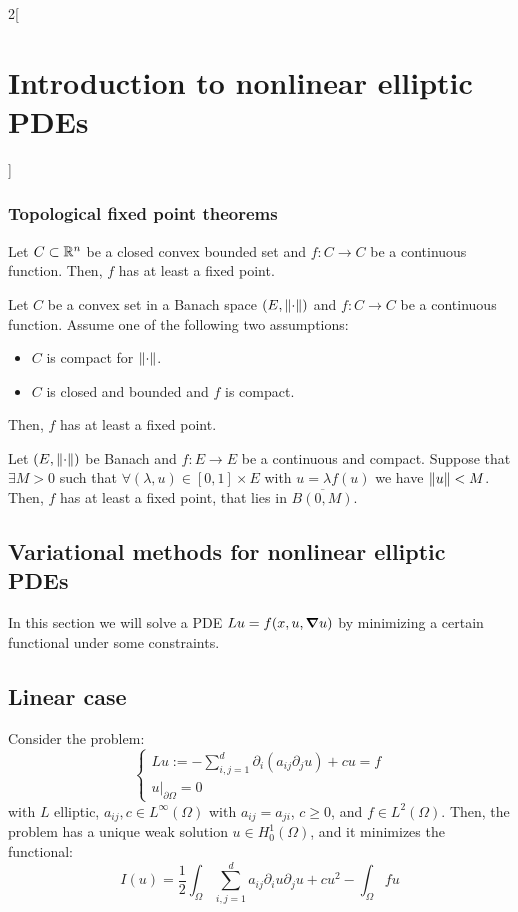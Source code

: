 \documentclass[../../../main_math.tex]{subfiles}
\begin{document}
\begin{multicols}{2}[\section{Introduction to nonlinear elliptic PDEs}]
  \subsubsection{Topological fixed point theorems}
  \begin{theorem}
    Let $C\subset \mathbb{R}^n$ be a closed convex bounded set and $f:C\to C$ be a continuous function. Then, $f$ has at least a fixed point.
  \end{theorem}
  \begin{theorem}
    Let $C$ be a convex set in a Banach space $(E,\left\|\cdot\right\|)$ and $f:C\to C$ be a continuous function. Assume one of the following two assumptions:
    \begin{itemize}
      \item $C$ is compact for $\left\|\cdot\right\|$.
      \item $C$ is closed and bounded and $f$ is compact.
    \end{itemize}
    Then, $f$ has at least a fixed point.
  \end{theorem}
  \begin{theorem}
    Let $(E, \left\|\cdot\right\|)$ be Banach and $f:E\to E$ be a continuous and compact. Suppose that $\exists M>0$ such that $\forall (\lambda,u)\in [0,1]\times E$ with $u=\lambda f(u)$ we have $\left\|u\right\|<M$. Then, $f$ has at least a fixed point, that lies in $\overline{B(0,M)}$.
  \end{theorem}
  \subsection{Variational methods for nonlinear elliptic PDEs}
  In this section we will solve a PDE $Lu=f(x,u,\grad u)$ by minimizing a certain functional under some constraints.
  \subsection{Linear case}
  \begin{proposition}
    Consider the problem:
    $$
      \begin{cases}
        Lu:=-\sum_{i,j=1}^d \partial_i(a_{ij}\partial_j u)+cu=f \\
        u|_{\partial\Omega}=0
      \end{cases}
    $$
    with $L$ elliptic, $a_{ij},c\in L^\infty(\Omega)$ with $a_{ij}= a_{ji}$, $c\geq 0$, and $f\in L^2(\Omega)$. Then, the problem has a unique weak solution $u\in H_0^1(\Omega)$, and it minimizes the functional:
    $$
      I(u)=\frac{1}{2}\int_\Omega\sum_{i,j=1}^d a_{ij}\partial_iu\partial_ju+cu^2-\int_\Omega fu
    $$
  \end{proposition}


\end{multicols}
\end{document}
